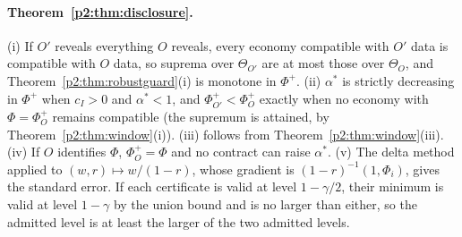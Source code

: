 \paragraph{Theorem~\ref{p2:thm:disclosure}.} (i) If $O'$ reveals everything $O$ reveals, every economy compatible with $O'$ data is compatible with $O$ data, so suprema over $\Theta_{O'}$ are at most those over $\Theta_O$, and Theorem~\ref{p2:thm:robustguard}(i) is monotone in $\Phi^+$. (ii) $\alpha^*$ is strictly decreasing in $\Phi^+$ when $c_I>0$ and $\alpha^*<1$, and $\Phi^+_{O'}<\Phi^+_O$ exactly when no economy with $\Phi=\Phi^+_O$ remains compatible (the supremum is attained, by Theorem~\ref{p2:thm:window}(i)). (iii) follows from Theorem~\ref{p2:thm:window}(iii). (iv) If $O$ identifies $\Phi$, $\Phi^+_O=\Phi$ and no contract can raise $\alpha^*$. (v) The delta method applied to $(w,r)\mapsto w/(1-r)$, whose gradient is $(1-r)^{-1}(1,\Phi_i)$, gives the standard error. If each certificate is valid at level $1-\gamma/2$, their minimum is valid at level $1-\gamma$ by the union bound and is no larger than either, so the admitted level is at least the larger of the two admitted levels.

